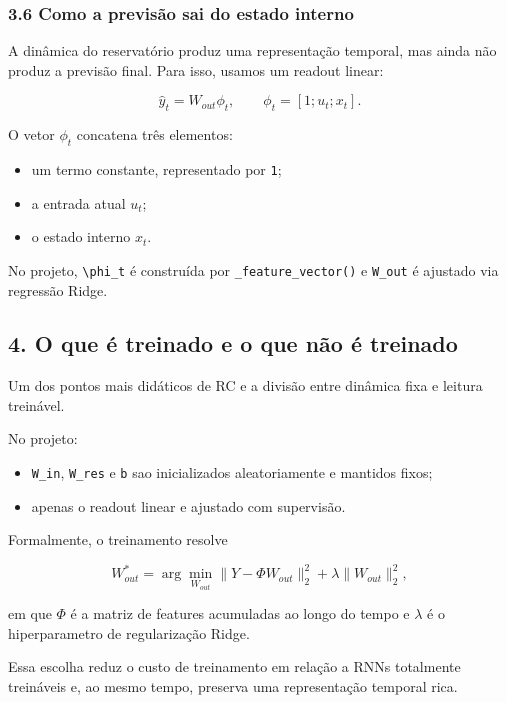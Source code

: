 \documentclass[12pt]{article}
\providecommand{\tightlist}{%
  \setlength{\itemsep}{0pt}\setlength{\parskip}{0pt}}
\begin{document}
\subsubsection{3.6 Como a previsão sai do estado interno}\label{36-como-a-previsuxe3o-sai-do-estado-interno}

A dinâmica do reservatório produz uma representação temporal, mas ainda não produz a previsão final. Para isso, usamos um readout linear:

\[
\hat{y}_t = W_{out} \phi_t,
\qquad
\phi_t = [1; u_t; x_t].
\]

O vetor \(\phi_t\) concatena três elementos:

\begin{itemize}
\tightlist
\item
  um termo constante, representado por \texttt{1};
\item
  a entrada atual \(u_t\);
\item
  o estado interno \(x_t\).
\end{itemize}

No projeto, \texttt{\textbackslash{}phi\_t} é construída por \texttt{\_feature\_vector()} e \texttt{W\_out} é ajustado via regressão Ridge.

\subsection{4. O que é treinado e o que não é treinado}\label{4-o-que-uxe9-treinado-e-o-que-nuxe3o-uxe9-treinado}

Um dos pontos mais didáticos de RC e a divisão entre dinâmica fixa e leitura treinável.

No projeto:

\begin{itemize}
\tightlist
\item
  \texttt{W\_in}, \texttt{W\_res} e \texttt{b} sao inicializados aleatoriamente e mantidos fixos;
\item
  apenas o readout linear e ajustado com supervisão.
\end{itemize}

Formalmente, o treinamento resolve

\[
W_{out}^* = \arg\min_{W_{out}}
\|Y - \Phi W_{out}\|_2^2 + \lambda \|W_{out}\|_2^2,
\]

em que \(\Phi\) é a matriz de features acumuladas ao longo do tempo e \(\lambda\) é o hiperparametro de regularização Ridge.

Essa escolha reduz o custo de treinamento em relação a RNNs totalmente treináveis e, ao mesmo tempo, preserva uma representação temporal rica.
\end{document}
